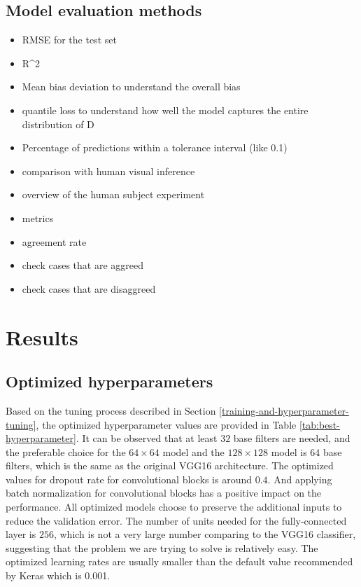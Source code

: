 \documentclass[]{interact}
\theoremstyle{plain}%
\theoremstyle{definition}
\theoremstyle{remark}
\begin{document}
\hypertarget{model-evaluation-methods}{%
\subsection{Model evaluation methods}\label{model-evaluation-methods}}

\begin{itemize}
\item
  RMSE for the test set
\item
  R\^{}2
\item
  Mean bias deviation to understand the overall bias
\item
  quantile loss to understand how well the model captures the entire
  distribution of D
\item
  Percentage of predictions within a tolerance interval (like 0.1)
\item
  comparison with human visual inference
\item
  overview of the human subject experiment
\item
  metrics
\item
  agreement rate
\item
  check cases that are aggreed
\item
  check cases that are disaggreed
\end{itemize}

\hypertarget{results}{%
\section{Results}\label{results}}

\hypertarget{optimized-hyperparameters}{%
\subsection{Optimized hyperparameters}\label{optimized-hyperparameters}}

Based on the tuning process described in Section
\ref{training-and-hyperparameter-tuning}, the optimized hyperparameter
values are provided in Table \ref{tab:best-hyperparameter}. It can be
observed that at least \(32\) base filters are needed, and the
preferable choice for the \(64 \times 64\) model and the
\(128 \times 128\) model is \(64\) base filters, which is the same as
the original VGG16 architecture. The optimized values for dropout rate
for convolutional blocks is around \(0.4\). And applying batch
normalization for convolutional blocks has a positive impact on the
performance. All optimized models choose to preserve the additional
inputs to reduce the validation error. The number of units needed for
the fully-connected layer is \(256\), which is not a very large number
comparing to the VGG16 classifier, suggesting that the problem we are
trying to solve is relatively easy. The optimized learning rates are
usually smaller than the default value recommended by Keras which is
0.001.
\end{document}
